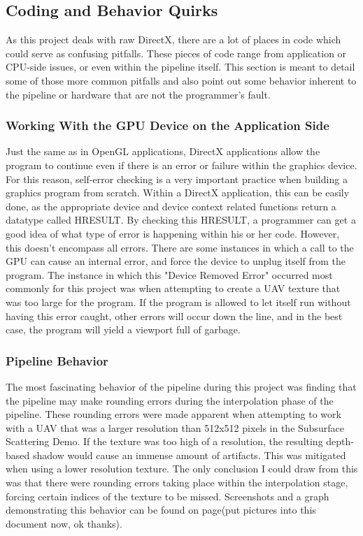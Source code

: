 \documentclass[a4paper, 12pt]{article}
\begin{document}
\subsection{Coding and Behavior Quirks}

As this project deals with raw DirectX, there are a lot of places in code
which could serve as confusing pitfalls. These pieces of code range from
application or CPU-side issues, or even within the pipeline itself. This
section is meant to detail some of those more common pitfalls and also point
out some behavior inherent to the pipeline or hardware that are not the
programmer's fault.

\subsubsection{Working With the GPU Device on the Application Side}

Just the same as in OpenGL applications, DirectX applications allow the
program to continue even if there is an error or failure within the graphics
device. For this reason, self-error checking is a very important practice when
building a graphics program from scratch. Within a DirectX application, this
can be easily done, as the appropriate device and device context related
functions return a datatype called HRESULT. By checking this HRESULT, a
programmer can get a good idea of what type of error is happening within his
or her code. However, this doesn't encompass all errors. There are some
instances in which a call to the GPU can cause an internal error, and force
the device to unplug itself from the program. The instance in which this
"Device Removed Error" occurred most commonly for this project was when
attempting to create a UAV texture that was too large for the program. If the
program is allowed to let itself run without having this error caught, other
errors will occur down the line, and in the best case, the program will yield
a viewport full of garbage.

\subsubsection{Pipeline Behavior}

The most fascinating behavior of the pipeline during this project was finding
that the pipeline may make rounding errors during the interpolation phase of
the pipeline. These rounding errors were made apparent when attempting to work
with a UAV that was a larger resolution than 512x512 pixels in the Subsurface
Scattering Demo. If the texture was too high of a resolution, the resulting
depth-based shadow would cause an immense amount of artifacts. This was
mitigated when using a lower resolution texture. The only conclusion I could
draw from this was that there were rounding errors taking place within the
interpolation stage, forcing certain indices of the texture to be missed.
Screenshots and a graph demonstrating this behavior can be found on page(put
pictures into this document now, ok thanks).
\end{document}
